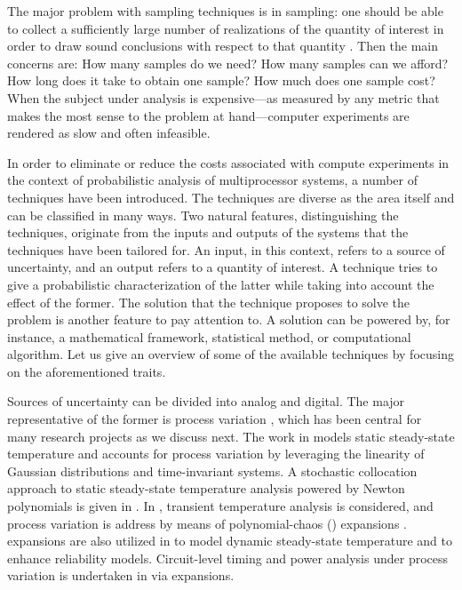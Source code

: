 The major problem with sampling techniques is in sampling: one should be able to
collect a sufficiently large number of realizations of the quantity of interest
in order to draw sound conclusions with respect to that quantity
\cite{diaz-emparanza2002}. Then the main concerns are: How many samples do we
need? How many samples can we afford? How long does it take to obtain one
sample? How much does one sample cost? When the subject under analysis is
expensive---as measured by any metric that makes the most sense to the problem
at hand---computer experiments are rendered as slow and often infeasible.

In order to eliminate or reduce the costs associated with compute experiments in
the context of probabilistic analysis of multiprocessor systems, a number of
techniques have been introduced. The techniques are diverse as the area itself
and can be classified in many ways. Two natural features, distinguishing the
techniques, originate from the inputs and outputs of the systems that the
techniques have been tailored for. An input, in this context, refers to a source
of uncertainty, and an output refers to a quantity of interest. A technique
tries to give a probabilistic characterization of the latter while taking into
account the effect of the former. The solution that the technique proposes to
solve the problem is another feature to pay attention to. A solution can be
powered by, for instance, a mathematical framework, statistical method, or
computational algorithm. Let us give an overview of some of the available
techniques by focusing on the aforementioned traits.

Sources of uncertainty can be divided into analog and digital. The major
representative of the former is process variation \cite{srivastava2005}, which
has been central for many research projects as we discuss next. The work in
\cite{juan2012} models static steady-state temperature and accounts for process
variation by leveraging the linearity of Gaussian distributions and
time-invariant systems. A stochastic collocation approach \cite{xiu2010} to
static steady-state temperature analysis powered by Newton polynomials is given
in \cite{lee2013}. In \cite{ukhov2014}, transient temperature analysis is
considered, and process variation is address by means of polynomial-chaos
() expansions \cite{xiu2010}.  expansions are also utilized in
\cite{ukhov2015} to model dynamic steady-state temperature and to enhance
reliability models. Circuit-level timing and power analysis under process
variation is undertaken in \cite{bhardwaj2008} via  expansions.

